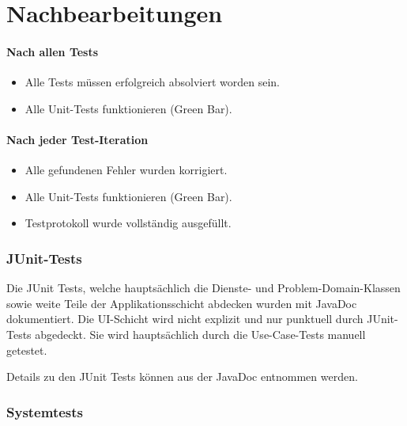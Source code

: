 \documentclass[12pt,halfparskip]{scrartcl}
\begin{document}
\section{Nachbearbeitungen}\label{sec:nachbearbeitungen}
	\paragraph{Nach allen Tests}\label{ssub:nach_allen_tests}
		\begin{itemize}
			\item Alle Tests müssen erfolgreich absolviert worden sein.
			\item Alle Unit-Tests funktionieren (Green Bar).
		\end{itemize}

	\paragraph{Nach jeder Test-Iteration}\label{ssub:nach_jeder_test_iteration}
		\begin{itemize}
			\item Alle gefundenen Fehler wurden korrigiert.
			\item Alle Unit-Tests funktionieren (Green Bar).
			\item Testprotokoll wurde vollständig ausgefüllt.
		\end{itemize}
		
\subsubsection{JUnit-Tests}
Die JUnit Tests, welche hauptsächlich die Dienste- und Problem-Domain-Klassen sowie weite Teile der Applikationsschicht abdecken wurden mit JavaDoc dokumentiert. Die UI-Schicht wird nicht explizit und nur punktuell durch JUnit-Tests abgedeckt. Sie wird hauptsächlich durch die Use-Case-Tests manuell getestet.

Details zu den JUnit Tests können aus der JavaDoc entnommen werden.

\subsubsection{Systemtests}
\end{document}
